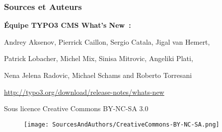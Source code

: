 \begin{frame}[fragile]
	\frametitle{Sources et Auteurs}

	\vspace{-0.6cm}

	\centerline{\textbf{Équipe TYPO3 CMS What's New~:}}

	\begin{center}
		\centerline{Andrey Aksenov, Pierrick Caillon, Sergio Catala, Jigal van Hemert,}
		\centerline{Patrick Lobacher, Michel Mix, Sinisa Mitrovic, Angeliki Plati,}
		\centerline{Nena Jelena Radovic, Michael Schams and Roberto Torresani}
	\end{center}

	\vspace{0.4cm}

	\smaller\begin{center}\url{http://typo3.org/download/release-notes/whats-new}\end{center}\normalsize

	\vspace{0.8cm}

	\smaller\begin{center}Sous licence Creative Commons BY-NC-SA 3.0\end{center}\normalsize
	\begin{figure}\vspace*{-0.4cm}
		\texttt{[image: SourcesAndAuthors/CreativeCommons-BY-NC-SA.png]}
	\end{figure}

\end{frame}

